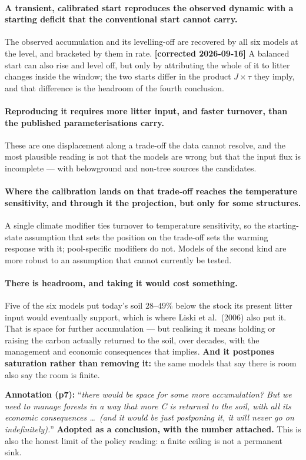 \documentclass[11pt]{article}
\begin{document}
\paragraph{A transient, calibrated start reproduces the observed dynamic with a starting deficit
that the conventional start cannot carry.} The observed accumulation and its levelling-off are
recovered by all six models at the level, and bracketed by them in rate. \textbf{[corrected
2026-09-16]} A balanced start can also rise and level off, but only by attributing the whole of it to
litter changes inside the window; the two starts differ in the product $J\times\tau$ they imply, and
that difference is the headroom of the fourth conclusion.

\paragraph{Reproducing it requires more litter input, and faster turnover, than the published
parameterisations carry.} These are one displacement along a trade-off the data cannot resolve, and
the most plausible reading is not that the models are wrong but that the input flux is incomplete ---
with belowground and non-tree sources the candidates.

\paragraph{Where the calibration lands on that trade-off reaches the temperature sensitivity, and
through it the projection, but only for some structures.} A single climate modifier ties turnover to
temperature sensitivity, so the starting-state assumption that sets the position on the trade-off sets
the warming response with it; pool-specific modifiers do not. Models of the second kind are more robust to an assumption that cannot currently be
tested.

\paragraph{There is headroom, and taking it would cost something.} Five of the six models put
today's soil $28$--$49\%$ below the stock its present litter input would eventually support, which is
where Liski et al.\ (2006) also put it. That is space for further accumulation --- but realising it
means holding or raising the carbon actually returned to the soil, over decades, with the management
and economic consequences that implies. \textbf{And it postpones saturation rather than removing it:}
the same models that say there is room also say the room is finite.
\begin{ann}
\textbf{Annotation (p7):} ``\emph{there would be space for some more accumulation? But we need to
manage forests in a way that more C is returned to the soil, with all its economic consequences \dots\
(and it would be just postponing it, it will never go on indefinitely).}'' \textbf{Adopted as a
conclusion, with the number attached.} This is also the honest limit of the policy reading: a finite
ceiling is not a permanent sink.
\end{ann}
\end{document}
